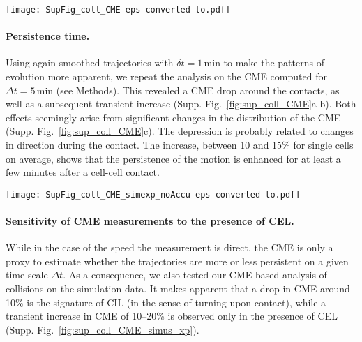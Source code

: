 \documentclass[11pt, twocolumn]{article}
\begin{document}
\begin{figure*}[ht!]
\centering
\texttt{[image: SupFig\_coll\_CME-eps-converted-to.pdf]}

\caption{Increase in CME after collisions.\\
  (a) Average CME before and after a single collision, using smoothed
  trajectories with $\delta t=1\,$min and $t_{free}=10$ (green), 15
  (blue) and 20\,min (red). Mean$\pm$SEM for $n=376, 232$ and $153$
  cell pairs respectively.  (b) Average normalised CME
  CME$/\overline{\text{CME}}$, where $\overline{v}$ is the basal speed
  of a single cell, before and after collisions. Same $\delta t$,
  $t_{free}$ and number of contacts as in (a).  (c) Logarithm of the
  $p$-value obtained from the Kolmogorov-Smirnov test against the null
  hypothesis that CME$(t)$ is distributed with the same PDF as
  CME$(-t_{free})$. Values above 1 denote when the null hypothesis can
  be rejected with more than 95\% confidence.}
\label{fig:sup_coll_CME}
\end{figure*}

\paragraph{Persistence time.}
Using again smoothed trajectories with $\delta t=1\,$min to make the
patterns of evolution more apparent, we repeat the analysis on the CME
computed for $\Delta t=5\,$min (see Methods). This revealed a CME drop
around the contacts, as well as a subsequent transient increase
(Supp. Fig.~\ref{fig:sup_coll_CME}a-b). Both effects seemingly arise
from significant changes in the distribution of the CME
(Supp. Fig.~\ref{fig:sup_coll_CME}c). The depression is probably
related to changes in direction during the contact. The increase,
between 10 and 15\% for single cells on average, shows that the
persistence of the motion is enhanced for at least a few minutes after
a cell-cell contact.

\begin{figure*}[ht!]
\centering
\texttt{[image: SupFig\_coll\_CME\_simexp\_noAccu-eps-converted-to.pdf]}

\caption{Single-cell-normalised CME: comparison of various simulation conditions with experimental data. Mean$\pm$SEM, $t_free=15\,$min.}
\label{fig:sup_coll_CME_simus_xp}
\end{figure*}

\paragraph{Sensitivity of CME measurements to the presence of CEL.}
While in the case of the speed the measurement is direct, the CME is
only a proxy to estimate whether the trajectories are more or less
persistent on a given time-scale $\Delta t$. As a consequence, we also
tested our CME-based analysis of collisions on the simulation data. It
makes apparent that a drop in CME around 10\% is the signature of CIL
(in the sense of turning upon contact), while a transient increase in
CME of 10--20\% is observed only in the presence of CEL
(Supp. Fig.~\ref{fig:sup_coll_CME_simus_xp}).
\end{document}

